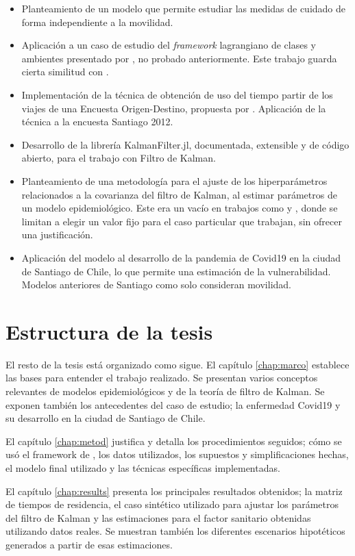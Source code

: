 \begin{intro}
\begin{itemize}
    \item Planteamiento de un modelo que permite estudiar las medidas de cuidado de forma independiente a la movilidad. 
    \item Aplicación a un caso de estudio del \textit{framework} lagrangiano de clases y ambientes presentado por \cite{Bichara2018}, no probado anteriormente. Este trabajo guarda cierta similitud con \cite{Shikhmurzaev}.
    \item Implementación de la técnica de obtención de uso del tiempo  partir de los viajes de una Encuesta Origen-Destino, propuesta por \cite{Munizaga2011}. Aplicación de la técnica a la encuesta Santiago 2012.
    \item Desarrollo de la librería KalmanFilter.jl, documentada, extensible y de código abierto, para el trabajo con Filtro de Kalman.
    \item Planteamiento de una metodología para el ajuste de los hiperparámetros relacionados a la covarianza del filtro de Kalman, al estimar parámetros de un modelo epidemiológico. Este era un vacío en trabajos como \cite{Hasan2020} y \cite{Sameni2020}, donde se limitan a elegir un valor fijo para el caso particular que trabajan, sin ofrecer una justificación.
    \item Aplicación del modelo al desarrollo de la pandemia de Covid19 en la ciudad de Santiago de Chile, lo que permite una estimación de la vulnerabilidad. Modelos anteriores de Santiago como \cite{Gozzi2021} solo consideran movilidad.
\end{itemize}

\section*{Estructura de la tesis}
El resto de la tesis está organizado como sigue. El capítulo \ref{chap:marco} establece las bases para entender el trabajo realizado. Se presentan varios conceptos relevantes de modelos epidemiológicos y de la teoría de filtro de Kalman. Se exponen también los antecedentes del caso de estudio; la enfermedad Covid19 y su desarrollo en la ciudad de Santiago de Chile.

El capítulo \ref{chap:metod} justifica y detalla los procedimientos seguidos; cómo se usó el framework de \cite{Bichara2018}, los datos utilizados, los supuestos y simplificaciones hechas, el modelo final utilizado y las técnicas específicas implementadas.

El capítulo \ref{chap:results} presenta los principales resultados obtenidos; la matriz de tiempos de residencia, el caso sintético utilizado para ajustar los parámetros del filtro de Kalman y las estimaciones para el factor sanitario obtenidas utilizando datos reales. Se muestran también los diferentes escenarios hipotéticos generados a partir de esas estimaciones.


\end{intro}
